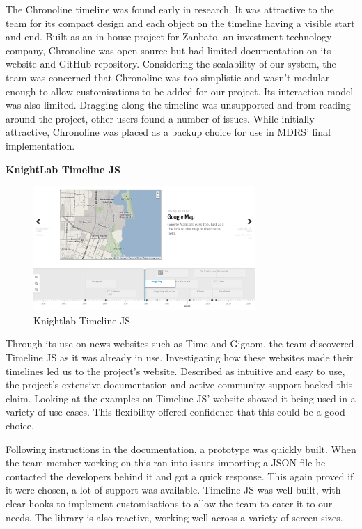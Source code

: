 \documentclass{l3proj}
\begin{document}
The Chronoline timeline was found early in research. It was attractive to the team for its compact design and each object on the timeline having a visible start and end. Built as an in-house project for Zanbato, an investment technology company, Chronoline was open source but had limited documentation on its website and GitHub repository. Considering the scalability of our system, the team was concerned that Chronoline was too simplistic and wasn't modular enough to allow customisations to be added for our project. Its interaction model was also limited. Dragging along the timeline was unsupported and from reading around the  project, other users found a number of issues. While initially attractive, Chronoline was placed as a backup choice for use in MDRS' final implementation.

\textbf{KnightLab Timeline JS}
\begin{figure}[ht!]
  \centering
\includegraphics[width=0.75\textwidth]{images/timeline-example.png}
\caption{Knightlab Timeline JS}
\end{figure}

Through its use on news websites such as Time and Gigaom, the team discovered Timeline JS as it was already in use. Investigating how these websites made their timelines led us to the project's website. Described as intuitive and easy to use, the project's extensive documentation and active community support backed this claim. Looking at the examples on Timeline JS' website showed it being used in a variety of use cases. This flexibility offered confidence that this could be a good choice.

Following instructions in the documentation, a prototype was quickly built. When the team member working on this ran into issues importing a JSON file he contacted the developers behind it and got a quick response. This again proved if it were chosen, a lot of support was available. Timeline JS was well built, with clear hooks to implement customisations to allow the team to cater it to our needs. The library is also reactive, working well across a variety of screen sizes.
\end{document}
